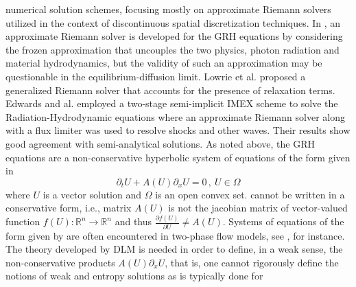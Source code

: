 \documentclass[times,doublespace]{fldauth}%
\begin{document}
numerical solution schemes, focusing mostly on approximate Riemann solvers 
utilized in the context of discontinuous spatial discretization techniques. In \cite{Balsara}, an 
approximate Riemann solver is developed for the GRH equations by considering the frozen approximation that 
uncouples the two physics, photon radiation and material hydrodynamics, but the validity of such an 
approximation may be questionable in the equilibrium-diffusion limit. Lowrie et al. \cite{LowrieMorelHittinger} 
proposed a generalized Riemann solver that accounts for the presence of relaxation terms. Edwards and al. 
\cite{EdwardsMorelLowrie} employed a two-stage semi-implicit IMEX scheme to solve the Radiation-Hydrodynamic 
equations where an approximate Riemann solver along with a flux limiter was used to resolve shocks and other waves. 
Their results show good agreement with semi-analytical solutions.
%
%
As noted above, the GRH equations are a  non-conservative hyperbolic system of equations of the form given in  
%
\begin{equation}\label{eq:nc-syst-eq}
\partial_t U + A(U) \partial_x U = 0 \, ,\ U \in \Omega
\end{equation}
%
where $U$ is a vector solution and $\Omega$ is an open convex set.  cannot be 
written in a conservative form, i.e., matrix $A(U)$ is not the jacobian matrix of vector-valued function $f(U): 
\mathbb{R}^n \to \mathbb{R}^n$ and thus $\frac{\partial f(U)}{\partial U} \ne A(U)$.  
Systems of equations of the form given by   are often encountered in two-phase flow models, see 
\cite{Saurel_2009, Ambroso_2012, Zein_2010, Li_2004, Saurel_2001b, Saurel_2001a, GuillardMurrone2003}, for instance. 
The theory developed by DLM \cite{dlm} is needed in order to define, in a weak sense, the non-conservative products $A(U) \partial_x U$,
that is, one cannot rigorously define the notions of weak and entropy solutions as is typically done for 
\end{document}
